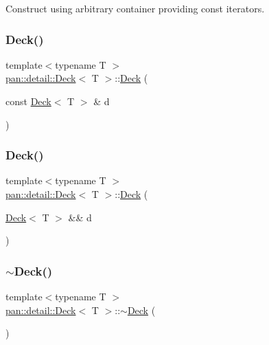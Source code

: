 Construct using arbitrary container providing const iterators. \mbox{\label{classpan_1_1detail_1_1_deck_a297086e3603a1960541f748c63af8ced}} 
\subsubsection{\texorpdfstring{Deck()}{Deck()}\hspace{0.1cm}{\footnotesize\ttfamily [4/5]}}
{\footnotesize\ttfamily template$<$typename T $>$ \\
\hyperlink{classpan_1_1detail_1_1_deck}{pan\+::detail\+::\+Deck}$<$ T $>$\+::\hyperlink{classpan_1_1detail_1_1_deck}{Deck} (\begin{DoxyParamCaption}\item[{const \hyperlink{classpan_1_1detail_1_1_deck}{Deck}$<$ T $>$ \&}]{d }\end{DoxyParamCaption})}

\mbox{\label{classpan_1_1detail_1_1_deck_a051b16fa5c1c5a40703dc1e8e1d9700e}} 
\subsubsection{\texorpdfstring{Deck()}{Deck()}\hspace{0.1cm}{\footnotesize\ttfamily [5/5]}}
{\footnotesize\ttfamily template$<$typename T $>$ \\
\hyperlink{classpan_1_1detail_1_1_deck}{pan\+::detail\+::\+Deck}$<$ T $>$\+::\hyperlink{classpan_1_1detail_1_1_deck}{Deck} (\begin{DoxyParamCaption}\item[{\hyperlink{classpan_1_1detail_1_1_deck}{Deck}$<$ T $>$ \&\&}]{d }\end{DoxyParamCaption})}

\mbox{\label{classpan_1_1detail_1_1_deck_a1ba732dffcccfdf0be1eb2481dc56421}} 
\subsubsection{\texorpdfstring{$\sim$\+Deck()}{~Deck()}}
{\footnotesize\ttfamily template$<$typename T $>$ \\
\hyperlink{classpan_1_1detail_1_1_deck}{pan\+::detail\+::\+Deck}$<$ T $>$\+::$\sim$\hyperlink{classpan_1_1detail_1_1_deck}{Deck} (\begin{DoxyParamCaption}{ }\end{DoxyParamCaption})}




